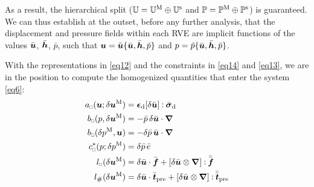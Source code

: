 \documentclass{bmcart}
\newcommand{\eqtref}[1]{\eqref{#1}}
\DeclarePairedDelimiter{\homgen}{\langle}{\rangle_\rve}
\newcommand{\prescribed}{\mathrm{pre}}
\renewcommand{\dev}{\mathrm{d}}
\newcommand{\rve}{
  {\mathchoice
   {\mbox{\scalebox{0.67}{$\Box$}}}
   {\mbox{\scalebox{0.67}{$\Box$}}}
   {\mbox{\scalebox{0.5}{$\Box$}}}
   {\mbox{\scalebox{0.375}{$\Box$}}}
  }
}
\begin{document}
As a result, the hierarchical split ($\mathbb{U} = \mathbb{U}^{\mathrm{M}} \oplus \mathbb{U}^{\mathrm{s}}$ and $\mathbb{P} = \mathbb{P}^{\mathrm{M}} \oplus \mathbb{P}^{\mathrm{s}}$) is guaranteed.
We can thus establish at the outset, before any further analysis, that the displacement and pressure fields within each RVE are implicit functions of the values $\bar{\boldsymbol{u}}$, $\bar{\boldsymbol{h}}$, $\bar{p}$, such that $\boldsymbol{u} = \tilde{\boldsymbol{u}}\{\bar{\boldsymbol{u}}, \bar{\boldsymbol{h}}, \bar{p}\}$ and $p = \tilde{p}\{\bar{\boldsymbol{u}}, \bar{\boldsymbol{h}}, \bar{p}\}$.

With the representations in \eqtref{eq12} and the constraints in \eqtref{eq14} and \eqtref{eq13}, we are in the position to compute the homogenized quantities that enter the system \eqtref{eq6}:
\begin{align}
    a_\rve(\ta{u};\delta\ta{u}^\macro) &=
    \ts{\epsilon}_\dev[\delta\bar{\ta{u}}] \dprod \bar{\ts{\sigma}}_\dev
\label{eq15a} \\
    b_\rve(p,\delta\ta{u}^\macro) &=
    - \bar{p}\,\delta\bar{\ta{u}}\cdot\diff
\label{eq15b} \\
    b_\rve(\delta p^\macro,\ta{u}) &=
    - \delta\bar{p}\,\bar{\ta{u}}\cdot\diff
\label{eq15c} \\
    c^*_\rve(p;\delta p^\macro) &=
    \delta\bar{p}\,\bar{e}
\label{eq15d} \\
    l_\rve(\delta\ta{u}^\macro) &=
    \delta\bar{\ta{u}}\cdot \bar{\ta f} + [\delta\bar{\ta{u}}\outerp\diff]\dprod \bar{\bar{\ta f}}
\label{eq15e} \\
    l_\#(\delta\ta{u}^\macro) &=
    \delta\bar{\ta{u}} \cdot \bar{\ta t}_\prescribed + [\delta\bar{\ta u}\outerp\diff]\dprod \bar{\bar{\ta{t}}}_\prescribed
\label{eq15f}
\end{align}
\end{document}
